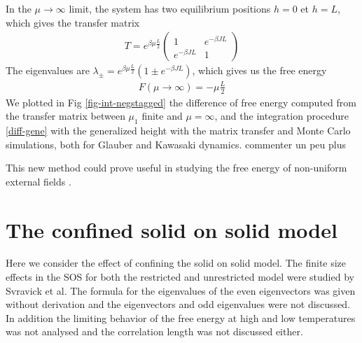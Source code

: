 {In the $\mu \rightarrow \infty$ limit, the system has two equilibrium positions $h=0$ et $h=L$, which gives the transfer matrix
\begin{align}
T= e^{\beta \mu \frac{L}{2}}
  \begin{pmatrix}
    1 & e^{-\beta  J L} \\
    e^{-\beta  J L} & 1
  \end{pmatrix}
\end{align}
The eigenvalues are $\lambda_\pm = e^{ \beta \mu \frac{L}{2}}( 1 \pm e^{-\beta J L})$, which gives us the free energy 
\begin{align}
  F(\mu \rightarrow \infty) = - \mu \frac{L}{2}
\end{align}
We plotted in Fig \ref{fig-int-negstagged} the difference of free energy computed from the transfer matrix between $\mu_1$ finite and $\mu=\infty$, and the integration procedure \eqref{diff-gene} with the generalized height with the matrix transfer and Monte Carlo simulations, both for Glauber and Kawasaki dynamics. {\color{red} commenter un peu plus}

This new method could prove useful in studying the free energy of non-uniform external fields \cite{bissacot_phase_2010}.
}
\section{The confined solid on solid model}
Here we consider the effect of confining the solid on solid model. The finite size effects in the SOS for both the restricted and unrestricted model were studied by Svravick et al. The formula for the eigenvalues of the even eigenvectors was given without derivation and the eigenvectors and odd eigenvalues were not discussed. In addition the limiting behavior of the free energy at high and low temperatures was not analysed and the correlation length was not discussed either. 

